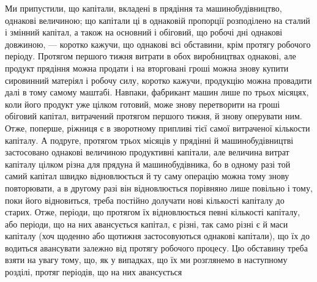Ми припустили, що капітали, вкладені в прядіння та машинобудівництво,
однакові величиною; що капітали ці в однаковій пропорції розподілено
на сталий і змінний капітал, а також на основний і обіговий,
що робочі дні однакові довжиною, — коротко кажучи, що однакові всі
обставини, крім протягу робочого періоду. Протягом першого тижня витрати
в обох виробництвах однакові, але продукт прядіння можна продати
і на вторговані гроші можна знову купити сировинний матеріял і
робочу силу, коротко кажучи, продукцію можна провадити далі в тому
самому маштабі. Навпаки, фабрикант машин лише по трьох місяцях, коли
його продукт уже цілком готовий, може знову перетворити на гроші обіговий
капітал, витрачений протягом першого тижня, й знову оперувати
ним. Отже, поперше, ріжниця є в зворотному припливі тієї самої витраченої
кількости капіталу. А подруге, протягом трьох місяців у прядінні
й машинобудівництві застосовано однакові величиною продуктивні капітали,
але величина витрат капіталу цілком різна для прядуна й машинобудівника,
бо в одному разі той самий капітал швидко відновлюється
й ту саму операцію можна тому знову повторювати, а в другому разі
він відновлюється порівняно лише повільно і тому, поки його відновиться,
треба постійно долучати нові кількості капіталу до старих. Отже, періоди,
що протягом їх відновлюється певні кількості капіталу, або періоди,
що на них авансується капітал, є різні, так само різні є й маси капіталу
(хоч щоденно або щотижня застосовуються однакові капітали), що їх до
водиться авансувати залежно від протягу робочого процесу. Цю обставину
треба взяти на увагу тому, що, як у випадках, що їх ми розглянемо
в наступному розділі, протяг періодів, що на них авансується
\parbreak{}  %

